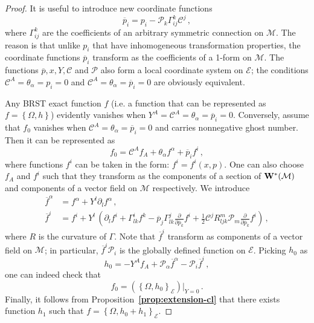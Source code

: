 \documentclass[a4paper,11pt]{amsart}
\numberwithin{thm}{section} %
\numberwithin{equation}{section} %
\numberwithin{figure}{section} %
\newcommand{\bref}[1]{{\bf \ref{#1}}}
\newcommand{\pb}[2]{\left\{{}#1{},{}#2{}\right\}}
\renewcommand{\:}{{\rm\, :\,}}
\def\bar{\overline}
\def\d{\partial}
\newcommand{\dl}[1]{\displaystyle\frac{{\d}}{\d #1}}
\def\half{{\frac{1}{2}}}
\def\cP{{\mathcal P}}
\def\cc{{\mathcal C}}
\def\manM{{\mathcal M}}
\def\E{{ \mathcal E}}
\def\W{{\bf W}}
\begin{document}
\begin{proof}
It is useful to introduce new coordinate functions
\begin{equation}
 {\bar p}_i=p_i-\cP_k\Gamma^k_{ij}\cc^j\,,
\end{equation}
where $\Gamma^k_{ij}$ are the coefficients of an arbitrary symmetric
connection on $\manM$.  The reason is that unlike $p_i$ that have
inhomogeneous transformation properties, the coordinate functions
${\bar p_i}$ transform as the coefficients of a 1-form on $\manM$.
The functions ${\bar p},x,Y,\cc$ and $\cP$ also form a local coordinate
system on $\E$; the conditions $\cc^A=\theta_\alpha=p_i=0$ and
$\cc^A=\theta_\alpha={\bar p}_i=0$ are obviously equivalent.

Any BRST exact function $f$ (i.e. a function that can be represented
as $f=\pb{\Omega}{h}$) evidently vanishes when
$Y^A=\cc^A=\theta_\alpha={\bar p}_i=0$. Conversely, assume that $f_0$
vanishes when $\cc^A=\theta_\alpha={\bar p}_i=0$ and carries
nonnegative ghost number. Then it can be represented as
\begin{equation}
f_0=\cc^A f_A+\theta_\alpha f^\alpha + {\bar p}_i f^i \,,
\end{equation}
where functions $f^i$ can be taken in the form: $f^i=f^i(x,p)$.
One can also choose $f_A$ and $f^i$ such that they transform
as the components of a section of $\W^*(\manM)$ and
components of a vector field on $\manM$ respectively.
We introduce
\begin{equation}
\begin{split}
{\bar f}^\alpha&=f^\alpha+Y^l \d_l f^\alpha\,,\\
{\bar f}^i&= f^i +
Y^l\, (\d_l f^i + \Gamma^i_{lk} f^k - {\bar p}_j \Gamma^j_{lk} \dl{{\bar p}_k}
f^i + \half \cc^j R^m_{ljk}\cP_m \dl{{\bar p}_k}f^i)\,,
\end{split}
\end{equation}
where $R$ is the curvature of $\Gamma$.  Note
that ${\bar  f}^i$ transform as components of a vector field on
$\manM$; in particular, ${\bar f}^i\cP_i$ is the globally defined
function on $\E$.  Picking $h_0$ as
\begin{equation}
{h_0}=
-Y^A f_A
+\cP_\alpha {\bar f}^\alpha
-\cP_i {\bar f}^i
 \,,
\end{equation}
one can indeed check that
\begin{equation}
f_0=\left( \pb{\Omega}{{h_0}}_\E \right)|_{Y=0}\,.
\end{equation}
Finally, it follows from Proposition~\bref{prop:extension-cl} that there
exists function $h_1$ such that $f=\pb{\Omega}{h_0+h_1}_\E$.
\end{proof}
\end{document}
